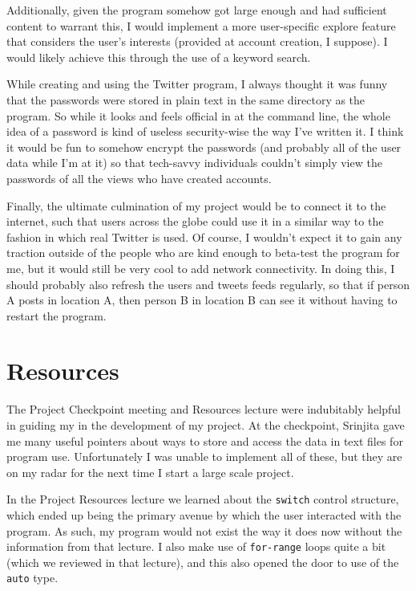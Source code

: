 \documentclass[twocolumn]{article}
\begin{document}
Additionally, given the program somehow got large enough and had sufficient content to warrant this, I would implement a more user-specific explore feature that considers the user's interests (provided at account creation, I suppose). I would likely achieve this through the use of a keyword search.

While creating and using the Twitter program, I always thought it was funny that the passwords were stored in plain text in the same directory as the program. So while it looks and feels official in at the command line, the whole idea of a password is kind of useless security-wise the way I've written it. I think it would be fun to somehow encrypt the passwords (and probably all of the user data while I'm at it) so that tech-savvy individuals couldn't simply view the passwords of all the views who have created accounts.

Finally, the ultimate culmination of my project would be to connect it to the internet, such that users across the globe could use it in a similar way to the fashion in which real Twitter is used. Of course, I wouldn't expect it to gain any traction outside of the people who are kind enough to beta-test the program for me, but it would still be very cool to add network connectivity. In doing this, I should probably also refresh the users and tweets feeds regularly, so that if person A posts in location A, then person B in location B can see it without having to restart the program.

\section*{Resources}

The Project Checkpoint meeting and Resources lecture were indubitably helpful in guiding my in the development of my project. At the checkpoint, Srinjita gave me many useful pointers about ways to store and access the data in text files for program use. Unfortunately I was unable to implement all of these, but they are on my radar for the next time I start a large scale project.

In the Project Resources lecture we learned about the \texttt{switch} control structure, which ended up being the primary avenue by which the user interacted with the program. As such, my program would not exist the way it does now without the information from that lecture. I also make use of \texttt{for-range} loops quite a bit (which we reviewed in that lecture), and this also opened the door to use of the \texttt{auto} type.
\end{document}
